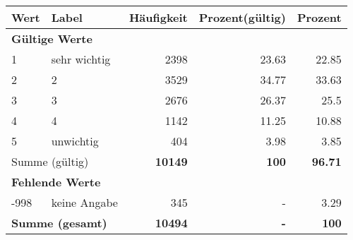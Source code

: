      \begin{longtable}{lXrrr}
     \toprule
     \textbf{Wert} & \textbf{Label} & \textbf{Häufigkeit} & \textbf{Prozent(gültig)} & \textbf{Prozent} \\
     \endhead
     \midrule
     \multicolumn{5}{l}{\textbf{Gültige Werte}}\\

     1 &
     \multicolumn{1}{X}{ sehr wichtig   } &


       \num{2398} &
       \num[round-mode=places,round-precision=2]{23.63} &
         \num[round-mode=places,round-precision=2]{22.85} \\

     2 &
     \multicolumn{1}{X}{ 2   } &


       \num{3529} &
       \num[round-mode=places,round-precision=2]{34.77} &
         \num[round-mode=places,round-precision=2]{33.63} \\

     3 &
     \multicolumn{1}{X}{ 3   } &


       \num{2676} &
       \num[round-mode=places,round-precision=2]{26.37} &
         \num[round-mode=places,round-precision=2]{25.5} \\

     4 &
     \multicolumn{1}{X}{ 4   } &


       \num{1142} &
       \num[round-mode=places,round-precision=2]{11.25} &
         \num[round-mode=places,round-precision=2]{10.88} \\

     5 &
     \multicolumn{1}{X}{ unwichtig   } &


       \num{404} &
       \num[round-mode=places,round-precision=2]{3.98} &
         \num[round-mode=places,round-precision=2]{3.85} \\
     \midrule
     \multicolumn{2}{l}{Summe (gültig)} &
       \textbf{\num{10149}} &
     \textbf{\num{100}} &
       \textbf{\num[round-mode=places,round-precision=2]{96.71}} \\
     \multicolumn{5}{l}{\textbf{Fehlende Werte}}\\
       -998 &
       keine Angabe &
         \num{345} &
        - &
         \num[round-mode=places,round-precision=2]{3.29} \\
     \midrule
     \multicolumn{2}{l}{\textbf{Summe (gesamt)}} &
          \textbf{\num{10494}} &
        \textbf{-} &
        \textbf{\num{100}} \\
     \bottomrule
     \end{longtable}
     
